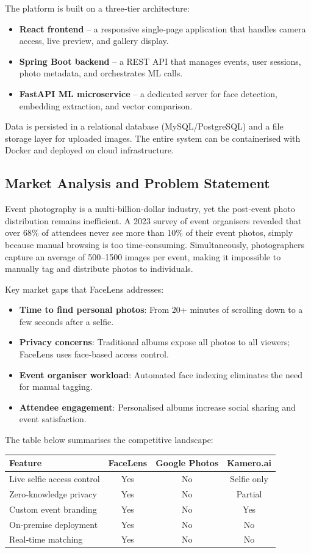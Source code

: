 \documentclass[12pt,a4paper]{article}
\begin{document}
The platform is built on a three‑tier architecture:
\begin{itemize}
    \item \textbf{React frontend} – a responsive single‑page application that handles camera access, live preview, and gallery display.
    \item \textbf{Spring Boot backend} – a REST API that manages events, user sessions, photo metadata, and orchestrates ML calls.
    \item \textbf{FastAPI ML microservice} – a dedicated server for face detection, embedding extraction, and vector comparison.
\end{itemize}
Data is persisted in a relational database (MySQL/PostgreSQL) and a file storage layer for uploaded images. The entire system can be containerised with Docker and deployed on cloud infrastructure.

\subsection{Market Analysis and Problem Statement}
Event photography is a multi‑billion‑dollar industry, yet the post‑event photo distribution remains inefficient. A 2023 survey of event organisers revealed that over 68\% of attendees never see more than 10\% of their event photos, simply because manual browsing is too time‑consuming. Simultaneously, photographers capture an average of 500–1500 images per event, making it impossible to manually tag and distribute photos to individuals.

Key market gaps that FaceLens addresses:
\begin{itemize}
    \item \textbf{Time to find personal photos}: From 20+ minutes of scrolling down to a few seconds after a selfie.
    \item \textbf{Privacy concerns}: Traditional albums expose all photos to all viewers; FaceLens uses face‑based access control.
    \item \textbf{Event organiser workload}: Automated face indexing eliminates the need for manual tagging.
    \item \textbf{Attendee engagement}: Personalised albums increase social sharing and event satisfaction.
\end{itemize}

The table below summarises the competitive landscape:

\begin{center}
\begin{tabular}{lccc}
\toprule
\textbf{Feature} & \textbf{FaceLens} & \textbf{Google Photos} & \textbf{Kamero.ai} \\
\midrule
Live selfie access control & Yes & No & Selfie only \\
Zero‑knowledge privacy & Yes & No & Partial \\
Custom event branding & Yes & No & Yes \\
On‑premise deployment & Yes & No & No \\
Real‑time matching & Yes & No & No \\
\bottomrule
\end{tabular}
\end{center}
\end{document}
